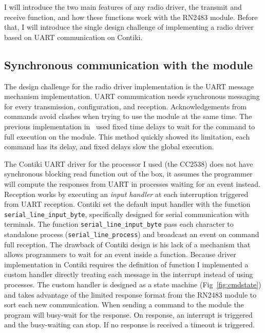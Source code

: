 I will introduce the two main features of any radio driver, the transmit and receive
function, and how these functions work with the RN2483 module.
Before that, I will introduce the single design challenge of implementing a radio
driver based on UART communication on Contiki.

\subsection{Synchronous communication with the module}

The design challenge for the radio driver implementation is the
UART message mechanism implementation.
UART communication needs synchronous messaging for every
transmission, configuration, and reception.
Acknowledgements from commands avoid
clashes when trying to use the module at the same time.
The previous implementation in~\cite{8847137} used fixed time delays to
wait for the command to full execution on the module. This method
quickly showed its limitation, each command has its delay, and
fixed delays slow the global execution.

The Contiki UART driver for the processor I used (the CC2538) does not have synchronous
blocking read function out of the box, it assumes the programmer will compute the
responses from UART in processes waiting for an event instead.
Reception works by executing an \emph{input handler} at each interruption
triggered from UART reception.
Contiki set the default input handler with the function
\lstinline{serial_line_input_byte},
specifically designed for serial communication with terminals.
The function \lstinline{serial_line_input_byte} pass each character to standalone
process (\lstinline{serial_line_process}) and broadcast an event on command
full reception.
The drawback of Contiki design is his lack of a mechanism that allows programmers
to wait for an event inside a function.
Because driver implementation in Contiki requires the definition of function
I implemented a custom handler directly treating each message in the
interrupt instead of using processes.
The custom handler is designed as a state machine (Fig~\ref{fig:cmdstate}) and
takes advantage of the limited response
format from the RN2483 module to sort each new communication.
When sending a command to the module the program will busy-wait for the
response. On response, an interrupt is triggered and the busy-waiting can stop.
If no response is received a timeout is triggered.


